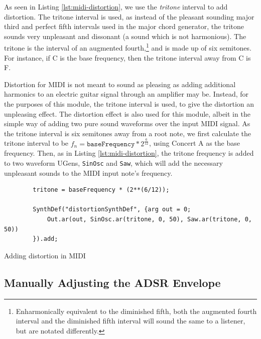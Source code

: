 As seen in Listing \ref{lst:midi-distortion}, we use the \textit{tritone} interval to add distortion. The tritone interval is used, as instead of the pleasant sounding major third and perfect fifth intervals used in the major chord generator, the tritone sounds very unpleasant and dissonant (a sound which is not harmonious). The tritone is the interval of an augmented fourth,\footnote{Enharmonically equivalent to the diminished fifth, both the augmented fourth interval and the diminished fifth interval will sound the same to a listener, but are notated differently.} and is made up of six semitones. For instance, if C is the base frequency, then the tritone interval away from C is F\musSharp{}.

Distortion for MIDI is not meant to sound as pleasing as adding additional harmonics to an electric guitar signal through an amplifier may be. Instead, for the purposes of this module, the tritone interval is used, to give the distortion an unpleasing effect. The distortion effect is also used for this module, albeit in the simple way of adding two pure sound waveforms over the input MIDI signal. As the tritone interval is six semitones away from a root note, we first calculate the tritone interval to be $f_n = \texttt{baseFrequency} * 2^\frac{6}{12}$, using Concert A as the base frequency. Then, as in Listing \ref{lst:midi-distortion}, the tritone frequency is added to two waveform UGens, \texttt{SinOsc} and \texttt{Saw}, which will add the necessary unpleasant sounds to the MIDI input note's frequency.

\begin{listing}
	\begin{lstlisting}
		tritone = baseFrequency * (2**(6/12));
			
		SynthDef("distortionSynthDef", {arg out = 0;
			Out.ar(out, SinOsc.ar(tritone, 0, 50), Saw.ar(tritone, 0, 50))
		}).add;
	\end{lstlisting}
	\caption{Adding distortion in MIDI}
	\label{lst:midi-distortion}
\end{listing}


\subsection{Manually Adjusting the ADSR Envelope}

